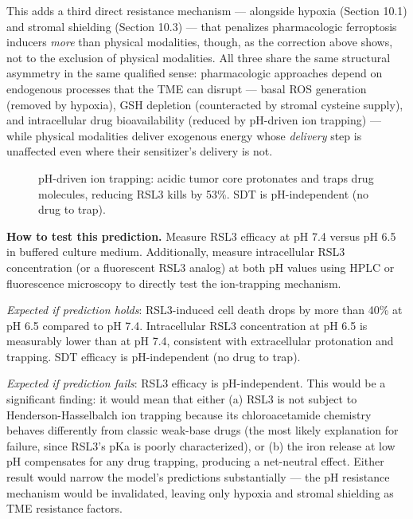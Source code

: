 \documentclass[11pt,twoside,openright]{report}
\begin{document}
This adds a third direct resistance mechanism --- alongside hypoxia (Section 10.1) and stromal shielding (Section 10.3) --- that penalizes pharmacologic ferroptosis inducers \textit{more} than physical modalities, though, as the correction above shows, not to the exclusion of physical modalities. All three share the same structural asymmetry in the same qualified sense: pharmacologic approaches depend on endogenous processes that the TME can disrupt --- basal ROS generation (removed by hypoxia), GSH depletion (counteracted by stromal cysteine supply), and intracellular drug bioavailability (reduced by pH-driven ion trapping) --- while physical modalities deliver exogenous energy whose \textit{delivery} step is unaffected even where their sensitizer's delivery is not.

\begin{figure}[tbp]
\setcounter{figure}{17}
\caption{pH-driven ion trapping: acidic tumor core protonates and traps drug molecules, reducing RSL3 kills by 53\%. SDT is pH-independent (no drug to trap).}
\label{fig:fig21_ph_ion_trapping}
\end{figure}

\textbf{How to test this prediction.} Measure RSL3 efficacy at pH 7.4 versus pH 6.5 in buffered culture medium. Additionally, measure intracellular RSL3 concentration (or a fluorescent RSL3 analog) at both pH values using HPLC or fluorescence microscopy to directly test the ion-trapping mechanism.

\textit{Expected if prediction holds}: RSL3-induced cell death drops by more than 40\% at pH 6.5 compared to pH 7.4. Intracellular RSL3 concentration at pH 6.5 is measurably lower than at pH 7.4, consistent with extracellular protonation and trapping. SDT efficacy is pH-independent (no drug to trap).

\textit{Expected if prediction fails}: RSL3 efficacy is pH-independent. This would be a significant finding: it would mean that either (a) RSL3 is not subject to Henderson-Hasselbalch ion trapping because its chloroacetamide chemistry behaves differently from classic weak-base drugs (the most likely explanation for failure, since RSL3's pKa is poorly characterized), or (b) the iron release at low pH compensates for any drug trapping, producing a net-neutral effect. Either result would narrow the model's predictions substantially --- the pH resistance mechanism would be invalidated, leaving only hypoxia and stromal shielding as TME resistance factors.
\end{document}
